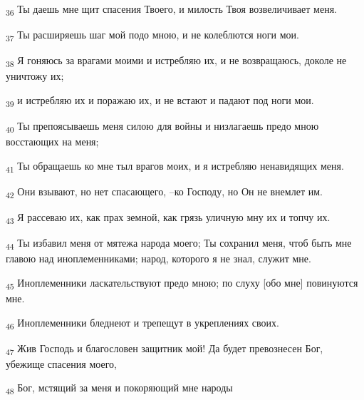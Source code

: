\begin{tcolorbox}
\textsubscript{36} Ты даешь мне щит спасения Твоего, и милость Твоя возвеличивает меня.
\end{tcolorbox}
\begin{tcolorbox}
\textsubscript{37} Ты расширяешь шаг мой подо мною, и не колеблются ноги мои.
\end{tcolorbox}
\begin{tcolorbox}
\textsubscript{38} Я гоняюсь за врагами моими и истребляю их, и не возвращаюсь, доколе не уничтожу их;
\end{tcolorbox}
\begin{tcolorbox}
\textsubscript{39} и истребляю их и поражаю их, и не встают и падают под ноги мои.
\end{tcolorbox}
\begin{tcolorbox}
\textsubscript{40} Ты препоясываешь меня силою для войны и низлагаешь предо мною восстающих на меня;
\end{tcolorbox}
\begin{tcolorbox}
\textsubscript{41} Ты обращаешь ко мне тыл врагов моих, и я истребляю ненавидящих меня.
\end{tcolorbox}
\begin{tcolorbox}
\textsubscript{42} Они взывают, но нет спасающего, --ко Господу, но Он не внемлет им.
\end{tcolorbox}
\begin{tcolorbox}
\textsubscript{43} Я рассеваю их, как прах земной, как грязь уличную мну их и топчу их.
\end{tcolorbox}
\begin{tcolorbox}
\textsubscript{44} Ты избавил меня от мятежа народа моего; Ты сохранил меня, чтоб быть мне главою над иноплеменниками; народ, которого я не знал, служит мне.
\end{tcolorbox}
\begin{tcolorbox}
\textsubscript{45} Иноплеменники ласкательствуют предо мною; по слуху [обо мне] повинуются мне.
\end{tcolorbox}
\begin{tcolorbox}
\textsubscript{46} Иноплеменники бледнеют и трепещут в укреплениях своих.
\end{tcolorbox}
\begin{tcolorbox}
\textsubscript{47} Жив Господь и благословен защитник мой! Да будет превознесен Бог, убежище спасения моего,
\end{tcolorbox}
\begin{tcolorbox}
\textsubscript{48} Бог, мстящий за меня и покоряющий мне народы
\end{tcolorbox}
